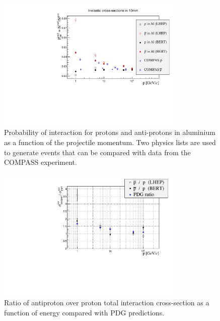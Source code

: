 \begin{center}
\begin{figure}[h]
\centering \includegraphics[width=0.8\textwidth]{Detector/figs/validation/General/pCompData_10mm.pdf}
\caption{Probability of interaction for protons and anti-protons in aluminium as a function of the projectile momentum.
Two physics lists are used to generate events that can be compared with data from the COMPASS experiment.}
\label{fig:AllXsec}
\end{figure}

\begin{figure}[h!]
\centering \includegraphics[width=0.8\textwidth]{Detector/figs/validation/ProtonsRatio_2.pdf}
\caption{Ratio of antiproton over proton total interaction cross-section as a function of energy compared with PDG predictions.}
\label{fig:ProtonsRatios}
\end{figure}


\end{center}
